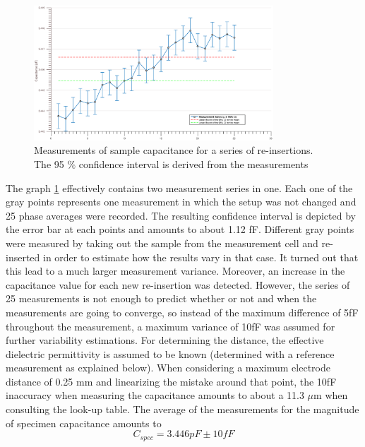\begin{figure}[ht]
	\centering
	\includegraphics[width=0.8\textwidth]{figures/Results/Capacitance_Measure/capacitanceplot.eps}		
	\caption[Kurze Abbildungsbeschreibung]{Measurements of sample capacitance for a series of re-insertions. The 95 $\%$ confidence interval is derived from the measurements} 
	\label{fig.messreihe}
\end{figure}

The graph \ref{fig.messreihe} effectively contains two measurement series in one. Each one of the gray points represents one measurement in which
the setup was not changed and 25 phase averages were recorded. The resulting confidence interval is depicted by the error bar at each points
and amounts to about 1.12 fF.
\newline
Different gray points were measured by taking out the sample from the measurement cell and re-inserted in order to estimate how the results vary in that case.
It turned out that this lead to a much larger measurement variance. Moreover, an increase in the capacitance value for each new re-insertion was detected.
However, the series of 25 measurements is not enough to predict whether or not and when the measurements are going to converge, so instead of the maximum difference of
5fF throughout the measurement, a maximum variance of 10fF was assumed for further variability estimations. 
\newline
For determining the distance, the 
effective dielectric permittivity is assumed to be known (determined with a reference measurement as explained below). When
considering a maximum electrode distance of 0.25 mm and linearizing the mistake around that point, the 10fF inaccuracy
when measuring the capacitance amounts to about a 11.3 $\mu$m when consulting the look-up table.
The average of the measurements for the magnitude of specimen capacitance amounts to
\begin{equation}
 C_{spec}=3.446pF \pm 10fF
\end{equation}

